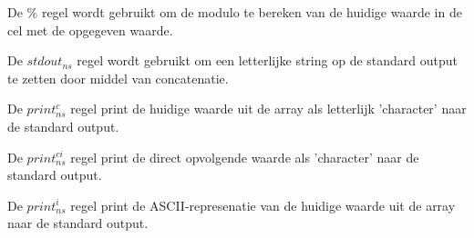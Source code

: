 \documentclass[11pt]{article}
\begin{document}
\begin{prooftree}
\end{prooftree}

De \% regel wordt gebruikt om de modulo te bereken van de huidige waarde in de cel met de opgegeven waarde.
\begin{prooftree}
\end{prooftree}

\begin{prooftree}
\end{prooftree}



De $stdout_{ns}$ regel wordt gebruikt om een letterlijke string op de standard output te zetten door middel van concatenatie.
\begin{prooftree}
\end{prooftree}


De $print^c_{ns}$ regel print de huidige waarde uit de array als letterlijk 'character' naar de standard output.
\begin{prooftree}
\end{prooftree}

De $print^{ci}_{ns}$ regel print de direct opvolgende waarde als 'character' naar de standard output.
\begin{prooftree}
\end{prooftree}

De $print^i_{ns}$ regel print de ASCII-represenatie van de huidige waarde uit de array naar de standard output.
\begin{prooftree}
\end{prooftree}
\end{document}
